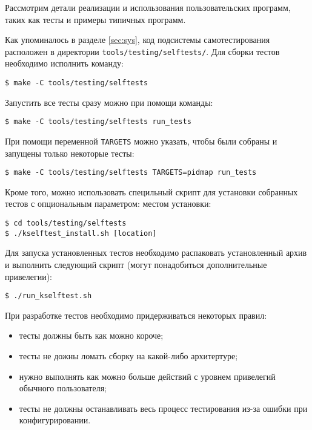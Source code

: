 Рассмотрим детали реализации и использования пользовательских программ, таких
как тесты и примеры типичных программ.

Как упоминалось в разделе \ref{sec:sys}, код подсистемы самотестирования
расположен в директории \texttt{tools/testing/selftests/}. Для сборки тестов
необходимо исполнить команду:
\medskip
\begin{lstlisting}[style=cstyle]
$ make -C tools/testing/selftests
\end{lstlisting}
\medskip

Запустить все тесты сразу можно при помощи команды:
\medskip
\begin{lstlisting}[style=cstyle]
$ make -C tools/testing/selftests run_tests
\end{lstlisting}
\medskip

При помощи переменной \texttt{TARGETS} можно указать, чтобы были собраны и
запущены только некоторые тесты:
\medskip
\begin{lstlisting}[style=cstyle]
$ make -C tools/testing/selftests TARGETS=pidmap run_tests
\end{lstlisting}
\medskip

Кроме того, можно использовать специльный скрипт для установки собранных тестов
с опциональным параметром: местом установки:
\medskip
\begin{lstlisting}[style=cstyle]
$ cd tools/testing/selftests
$ ./kselftest_install.sh [location]
\end{lstlisting}
\medskip

Для запуска установленных тестов необходимо распаковать установленный архив и
выполнить следующий скрипт (могут понадобиться дополнительные привелегии):
\medskip
\begin{lstlisting}[style=cstyle]
$ ./run_kselftest.sh
\end{lstlisting}
\medskip

При разработке тестов необходимо придерживаться некоторых правил:
\begin{itemize}
\item тесты должны быть как можно короче;
\item тесты не дожны ломать сборку на какой-либо архитертуре;
\item нужно выполнять как можно больше действий с уровнем привелегий обычного
  пользователя;
\item тесты не должны останавливать весь процесс тестирования из-за ошибки при
  конфигурировании.
\end{itemize}

